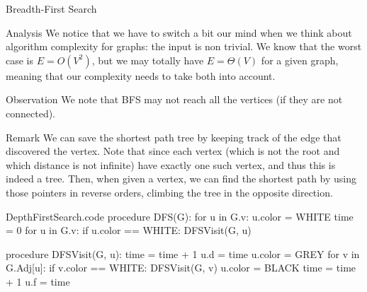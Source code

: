 \documentclass[a4paper]{article}
\begin{document}
\begin{parag}{Breadth-First Search}
\begin{subparag}{Analysis}
        We notice that we have to switch a bit our mind when we think about algorithm complexity for graphs: the input is non trivial. We know that the worst case is $E = O\left(V^2\right)$, but we may totally have $E = \Theta\left(V\right)$ for a given graph, meaning that our complexity needs to take both into account.
    \end{subparag}

    \begin{subparag}{Observation}
        We note that BFS may not reach all the vertices (if they are not connected).
    \end{subparag}

    \begin{subparag}{Remark}
        We can save the shortest path tree by keeping track of the edge that discovered the vertex. Note that since each vertex (which is not the root and which distance is not infinite) have exactly one such vertex, and thus this is indeed a tree. Then, when given a vertex, we can find the shortest path by using those pointers in reverse orders, climbing the tree in the opposite direction.
    \end{subparag}
\end{parag}

\begin{filecontents*}[overwrite]{DepthFirstSearch.code}
procedure DFS(G):
    for u in G.v:
        u.color = WHITE
    time = 0
    for u in G.v:
        if u.color == WHITE:
            DFSVisit(G, u)

procedure DFSVisit(G, u):
    time = time + 1
    u.d = time
    u.color = GREY
    for v in G.Adj[u]:
        if v.color == WHITE:
            DFSVisit(G, v)
    u.color = BLACK
    time = time + 1
    u.f = time
\end{filecontents*}
\end{document}
